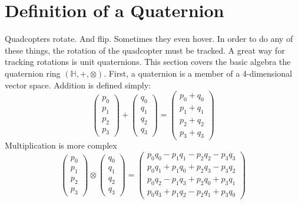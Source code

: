 \documentclass[lettersize,journal]{IEEEtran}
\begin{document}
\section*{Definition of a Quaternion}
Quadcopters rotate. And flip. Sometimes they even hover. In order to do any of these things, the rotation of the quadcopter must be tracked. A great way for tracking rotations is unit quaternions. This section covers the basic algebra the quaternion ring $\left(\mathbb{H}, +, \otimes\right)$.
First, a quaternion is a member of a 4-dimensional vector space. Addition is defined simply:
\begin{equation}
  \begin{pmatrix}
    p_0 \\
    p_1 \\
    p_2 \\
    p_3
  \end{pmatrix} +
  \begin{pmatrix}
    q_0 \\
    q_1 \\
    q_2 \\
    q_3
  \end{pmatrix} =
  \begin{pmatrix}
    p_0 + q_0 \\
    p_1 + q_1 \\
    p_2 + q_2 \\
    p_3 + q_3
  \end{pmatrix}
\end{equation}
Multiplication is more complex
\begin{equation}
 \begin{pmatrix}
    p_0 \\
    p_1 \\
    p_2 \\
    p_3
  \end{pmatrix} \otimes 
  \begin{pmatrix}
    q_0 \\
    q_1 \\
    q_2 \\
    q_3
  \end{pmatrix} =
  \begin{pmatrix}
    p_0q_0 - p_1q_1 - p_2q_2 - p_3q_3 \\
    p_0q_1 + p_1q_0 + p_2q_3 - p_3q_2 \\
    p_0q_2 - p_1q_3 + p_2q_0 + p_3q_1 \\
    p_0q_3 + p_1q_2 - p_2q_1 + p_3q_0
  \end{pmatrix}
\end{equation}
\end{document}
